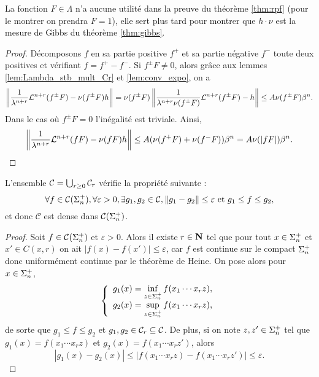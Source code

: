   \begin{remark}
    La fonction $F \in \Lambda$ n'a aucune utilité dans la preuve du théorème \ref{thm:rpf} (pour le montrer on prendra $F = 1$),
    elle sert plus tard pour montrer que $h\cdot\nu$ est la mesure de Gibbs du théorème \ref{thm:gibbs}.
  \end{remark}

  \begin{proof}
    Décomposons $f$ en sa partie positive $f^+$ et sa partie négative $f^-$ toute deux positives et vérifiant $f = f^+ - f^-$.
    Si $f^{\pm}F \not= 0$, alors grâce aux lemmes \ref{lem:Lambda_stb_mult_Cr} et \ref{lem:conv_expo}, on a
    $$\No{\frac{1}{\lambda^{n+r}}\L^{n+r} (f^{\pm}F) - \nu(f^{\pm}F)h} = \nu(f^{\pm}F)\No{\frac{1}{\lambda^{n+r}\nu(f^{\pm}F)}\L^{n+r}(f^{\pm}F) - h}
	\leq A\nu(f^{\pm}F)\beta^n.$$
    Dans le cas où $f^{\pm}F = 0$ l'inégalité est triviale.
    Ainsi,
    $$\No{\frac 1 {\lambda^{n+r}} \L^{n+r} (fF) - \nu(fF)h} \leq A(\nu(f^+F) + \nu(f^-F))\beta^n = A\nu(|fF|)\beta^n.$$
  \end{proof}

  \begin{lemma}
    \label{lem:unionCr_strong_density}
    L'ensemble $\mathcal C = \bigcup_{r\geq 0}{\Cr{r}}$ vérifie la propriété suivante :
    $$\forall f \in \Csp{n}, \forall \varepsilon > 0, \exists g_1, g_2 \in \mathcal C, \No{g_1 - g_2} \leq \varepsilon \text{ et } g_1\leq f\leq g_2,$$
    et donc $\mathcal C$ est dense dans $\Csp{n}$.
  \end{lemma}

  \begin{proof}
    Soit $f \in \Csp{n}$ et $\varepsilon > 0$. Alors il existe $r \in \N$ tel que pour tout $x \in \sp_n$ et $x' \in C(x, r)$ on ait
    $\left|f(x) - f(x')\right| \leq \varepsilon$, car $f$ est continue sur le compact $\sp_n$ donc uniformément continue par le théorème de Heine.
    On pose alors pour $x \in \sp_n$,
    $$\left\{\begin{array}{l}
	g_1(x) = \inf\limits_{z \in \sp_n}{f(x_1\cdots x_r z)}, \\
	g_2(x) = \sup\limits_{z \in \sp_n}{f(x_1\cdots x_r z)},
    \end{array}\right.$$
    de sorte que $g_1 \leq f \leq g_2$ et $g_1, g_2 \in \Cr{r} \subseteq \mathcal C$.
    De plus, si on note $z, z' \in \sp_n$ tel que $g_1(x) = f(x_1\cdots x_r z)$ et $g_2(x) = f(x_1 \cdots x_r z')$, alors
    $$\left|g_1(x) - g_2(x)\right| \leq \left|f(x_1\cdots x_r z) - f(x_1\cdots x_r z')\right| \leq \varepsilon.$$
  \end{proof}

